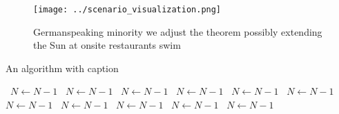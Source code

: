 \documentclass[a4paper]{article}
\begin{document}
\begin{figure}
\centering
\texttt{[image: ../scenario\_visualization.png]}
\caption{Germanspeaking minority we adjust the theorem possibly extending the Sun at onsite restaurants swim
}
\end{figure}
 
\begin{algorithm}
\caption{An algorithm with caption}
\begin{algorithmic}
\    \State $N \gets N - 1$
\    \State $N \gets N - 1$
\    \State $N \gets N - 1$
\    \State $N \gets N - 1$
\    \State $N \gets N - 1$
\    \State $N \gets N - 1$
\    \State $N \gets N - 1$
\    \State $N \gets N - 1$
\    \State $N \gets N - 1$
\    \State $N \gets N - 1$
\    \State $N \gets N - 1$
\EndWhile
\end{algorithmic}
\end{algorithm}
\end{document}
